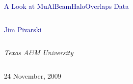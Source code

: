 \documentclass[compress]{beamer}
\begin{document}
\begin{frame}
\vfill
\begin{center}
\textcolor{darkblue}{\Large A Look at MuAlBeamHaloOverlaps Data}

\vfill
\begin{columns}
\begin{center}
\large
\textcolor{darkblue}{Jim Pivarski}
\end{center}
\end{columns}

\begin{columns}
\begin{center}
\scriptsize
{\it Texas A\&M University}
\end{center}
\end{columns}

\vfill
24 November, 2009

\end{center}
\end{frame}


\small
\end{document}
